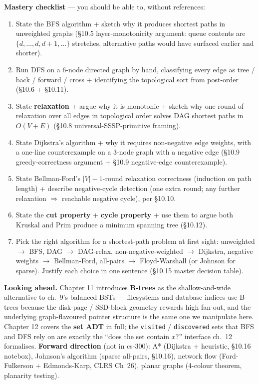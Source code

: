 \documentclass[11pt]{article}
\begin{document}
\begin{ideabox}
\textbf{Mastery checklist} --- you should be able to, without
references:
\begin{enumerate}
    \item State the BFS algorithm + sketch why it produces shortest
          paths in unweighted graphs (\S10.5 layer-monotonicity
          argument: queue contents are
          $\{d, \ldots, d, d+1, \ldots\}$ stretches, alternative
          paths would have surfaced earlier and shorter).
    \item Run DFS on a 6-node directed graph by hand, classifying
          every edge as tree / back / forward / cross + identifying
          the topological sort from post-order
          (\S10.6 + \S10.11).
    \item State \textbf{relaxation} + argue why it is monotonic +
          sketch why one round of relaxation over all edges in
          topological order solves DAG shortest paths in $O(V+E)$
          (\S10.8 universal-SSSP-primitive framing).
    \item State Dijkstra's algorithm + why it requires non-negative
          edge weights, with a one-line counterexample on a 3-node
          graph with a negative edge (\S10.9 greedy-correctness
          argument + \S10.9 negative-edge counterexample).
    \item State Bellman-Ford's $|V|-1$-round relaxation correctness
          (induction on path length) + describe negative-cycle
          detection (one extra round; any further relaxation
          $\Rightarrow$ reachable negative cycle), per \S10.10.
    \item State the \textbf{cut property} + \textbf{cycle property}
          + use them to argue both Kruskal and Prim produce a minimum
          spanning tree (\S10.12).
    \item Pick the right algorithm for a shortest-path problem at
          first sight: unweighted $\to$ BFS, DAG $\to$ DAG-relax,
          non-negative-weighted $\to$ Dijkstra, negative weights
          $\to$ Bellman-Ford, all-pairs $\to$ Floyd-Warshall (or
          Johnson for sparse). Justify each choice in one sentence
          (\S10.15 master decision table).
\end{enumerate}

\textbf{Looking ahead.} Chapter 11 introduces \textbf{B-trees} as
the shallow-and-wide alternative to ch.~9's balanced BSTs ---
filesystems and database indices use B-trees because the disk-page /
SSD-block geometry rewards high fan-out, and the underlying
graph-flavoured pointer structure is the same one we manipulate
here. Chapter 12 covers the \textbf{set ADT} in full; the
\texttt{visited} / \texttt{discovered} sets that BFS and DFS rely on
are exactly the ``does the set contain $x$?'' interface ch.~12
formalises. \textbf{Forward direction} (not in cs-300): A* (Dijkstra
+ heuristic, \S10.16 notebox), Johnson's algorithm (sparse all-pairs,
\S10.16), network flow (Ford-Fulkerson + Edmonds-Karp, CLRS Ch~26),
planar graphs (4-colour theorem, planarity testing).
\end{ideabox}
\end{document}

